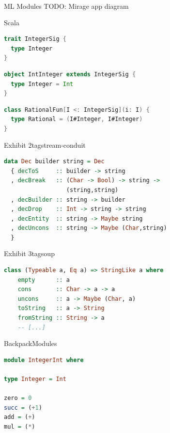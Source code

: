 \documentclass{beamer}
\begin{document}
\begin{frame}{ML Modules}
TODO: Mirage app diagram
\end{frame}

\begin{frame}[fragile]{Scala}
\begin{lstlisting}[language=Scala,title=trait \textasciitilde\ signature]
trait IntegerSig {
  type Integer
}
\end{lstlisting}
\begin{lstlisting}[language=Scala,title=object \textasciitilde\ structure]
object IntInteger extends IntegerSig {
  type Integer = Int
}
\end{lstlisting}
\begin{lstlisting}[language=Scala,title=class \textasciitilde\ functor]
class RationalFun[I <: IntegerSig](i: I) {
  type Rational = (I#Integer, I#Integer)
}
\end{lstlisting}
\end{frame}

\begin{frame}[fragile]{Exhibit 2}{tagstream-conduit}
\begin{lstlisting}[language=Haskell]
data Dec builder string = Dec
  { decToS     :: builder -> string
  , decBreak   :: (Char -> Bool) -> string ->
                  (string,string)
  , decBuilder :: string -> builder
  , decDrop    :: Int -> string -> string
  , decEntity  :: string -> Maybe string
  , decUncons  :: string -> Maybe (Char,string)
  }
\end{lstlisting}
\end{frame}

\begin{frame}[fragile]{Exhibit 3}{tagsoup}
\begin{lstlisting}[language=Haskell]
class (Typeable a, Eq a) => StringLike a where
    empty      :: a
    cons       :: Char -> a -> a
    uncons     :: a -> Maybe (Char, a)
    toString   :: a -> String
    fromString :: String -> a
    -- [...]
\end{lstlisting}
\end{frame}

\begin{frame}[fragile]{Backpack}{Modules}
\begin{lstlisting}[language=Haskell]
module IntegerInt where

type Integer = Int

zero = 0
succ = (+1)
add = (+)
mul = (*)
\end{lstlisting}
\end{frame}
\end{document}
